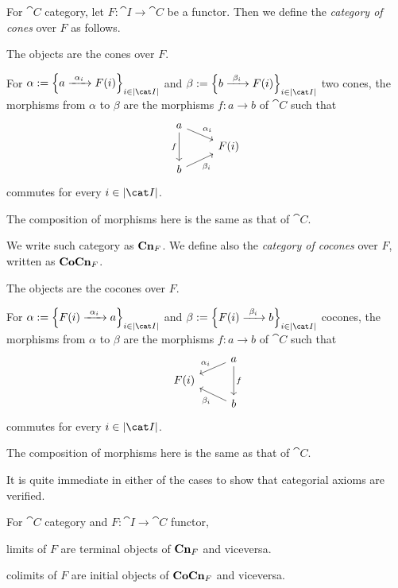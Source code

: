 \begin{construction}
For \(\cat C\) category, let \(F : \cat I \to \cat C\) be a functor. Then we define the {\em category of cones} over \(F\) as follows.
\begin{tcbitem}
\item The objects are the cones over \(F\).
\item For \(\alpha := \set{a \functo{\alpha_i} F(i)}_{i \in \obj{\cat I}}\) and \(\beta := \set{b \functo{\beta_i} F(i)}_{i \in \obj{\cat I}}\) two cones, the morphisms from \(\alpha\) to \(\beta\) are the morphisms \(f : a \to b\) of \(\cat C\) such that
\[\begin{tikzcd}[row sep=tiny]
a \ar["{\alpha_i}", dr] \ar["f", dd, swap] \\
& F(i) \\
b \ar["{\beta_i}", ur, swap]
\end{tikzcd}\]
commutes for every \(i \in \obj{\cat I}\).
\item The composition of morphisms here is the same as that of \(\cat C\).
\end{tcbitem}
We write such category as \(\mathbf{Cn}_F\). We define also the {\em category of cocones} over \(F\), written as \(\mathbf{CoCn}_F\).
\begin{tcbitem}
\item The objects are the cocones over \(F\).
\item For \(\alpha := \set{F(i) \functo{\alpha_i} a}_{i \in \obj{\cat I}}\) and \(\beta := \set{F(i) \functo{\beta_i} b}_{i \in \obj{\cat I}}\) cocones, the morphisms from \(\alpha\) to \(\beta\) are the morphisms \(f : a \to b\) of \(\cat C\) such that
\[\begin{tikzcd}[row sep=tiny]
& a \ar["{\alpha_i}", dl, swap] \ar["f", dd] \\
F(i) \\
& b \ar["{\beta_i}", ul]
\end{tikzcd}\]
commutes for every \(i \in \obj{\cat I}\).
\item The composition of morphisms here is the same as that of \(\cat C\).
\end{tcbitem}
It is quite immediate in either of the cases to show that categorial axioms are verified.
\end{construction}

\begin{proposition}
For \(\cat C\)  category and \(F : \cat I \to \cat C\) functor,
\begin{tcbitem}
\item limits of \(F\) are terminal objects of \(\mathbf{Cn}_F\) and viceversa.
\item colimits of \(F\) are initial objects of \(\mathbf{CoCn}_F\) and viceversa.
\end{tcbitem}
\end{proposition}

